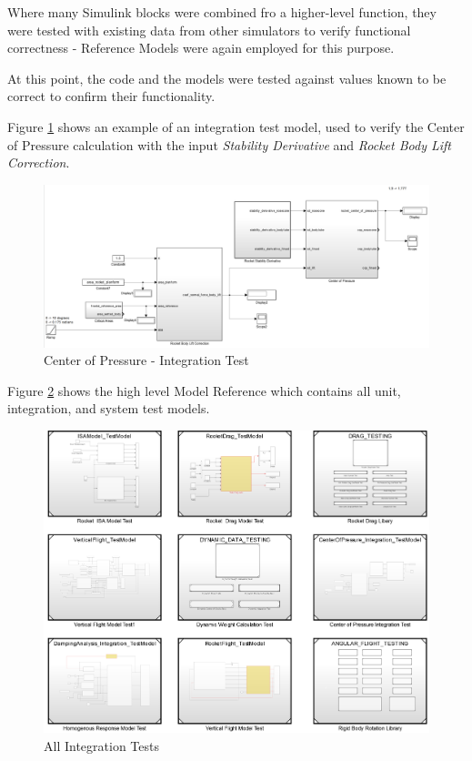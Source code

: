 \documentclass[]{article}
\begin{document}
Where many Simulink blocks were combined fro a higher-level function,
they were tested with existing data from other simulators to verify
functional correctness - Reference Models were again employed for this
purpose.

At this point, the code and the models were tested against values known
to be correct to confirm their functionality.

Figure \ref{cop_integration_tests_label} shows an example of an
integration test model, used to verify the Center of Pressure
calculation with the input \emph{Stability Derivative} and \emph{Rocket
Body Lift Correction}.

\begin{figure}[htbp]
\centering
\includegraphics{images/CenterOfPressure_Integration_TestModel.png}
\caption{Center of Pressure - Integration
Test\label{cop_integration_tests_label}}
\end{figure}

\clearpage 

Figure \ref{all_integration_tests_label} shows the high level Model
Reference which contains all unit, integration, and system test models.

\begin{figure}[htbp]
\centering
\includegraphics{images/ALL_TESTS.png}
\caption{All Integration Tests \label{all_integration_tests_label}}
\end{figure}
\end{document}
